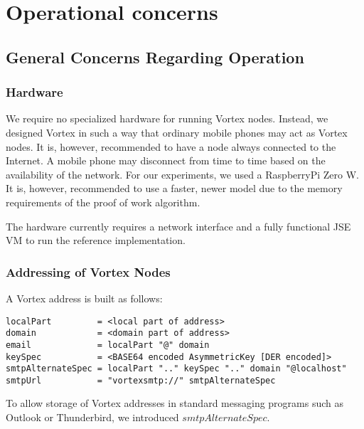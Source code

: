 \part{Operational concerns}\label{sec:operation}


\chapter{General Concerns Regarding Operation}
\section{Hardware}
We require no specialized hardware for running Vortex nodes. Instead, we designed Vortex in such a way that ordinary mobile phones may act as Vortex nodes. It is, however, recommended to have a node always connected to the Internet. A mobile phone may disconnect from time to time based on the availability of the network. For our experiments, we used a RaspberryPi Zero W. It is, however, recommended to use a faster, newer model due to the memory requirements of the proof of work algorithm. 

The hardware currently requires a network interface and a fully functional JSE VM to run the reference implementation.

\section{Addressing of Vortex Nodes}
A Vortex address is built as follows: 

\begin{lstlisting}[language=EBNF]
localPart         = <local part of address>
domain            = <domain part of address>
email             = localPart "@" domain
keySpec           = <BASE64 encoded AsymmetricKey [DER encoded]>
smtpAlternateSpec = localPart ".." keySpec ".." domain "@localhost"
smtpUrl           = "vortexsmtp://" smtpAlternateSpec
\end{lstlisting}

To allow storage of Vortex addresses in standard messaging programs such as Outlook or Thunderbird, we introduced $smtpAlternateSpec$. 

